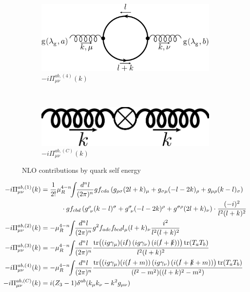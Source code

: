 \begin{figure}[ht!]
\begin{subfigure}[t]{.4\textwidth}
		\includegraphics[width=\textwidth]{pyfeyn/nlo-v-seghq}
		\caption{$-i\Pi_{\mu\nu}^{ab,(4)}(k)$}
	\end{subfigure}\\
	\begin{subfigure}[t]{.4\textwidth}
		\includegraphics[width=\textwidth]{pyfeyn/nlo-v-segc}
		\caption{$-i\Pi_{\mu\nu}^{ab,(C)}(k)$}
	\end{subfigure}
	\caption{NLO contributions by quark self energy}\label{fig:FeynNLOvseqg}
\end{figure}

\begin{align}
-i\Pi_{\mu\nu}^{ab,(1)}(k) &= \frac 1 {2!} \mu_R^{4-n}\!\!\int\!\!\frac{d^nl}{(2\pi)^n} gf_{cda}\left(g_{\rho\sigma}(2l+k)_{\mu}+g_{\sigma\mu}(-l-2k)_\rho+g_{\mu\rho}(k-l)_\sigma\right)\nonumber\\
 &\hspace{30pt}\cdot gf_{cbd}\left(g^\rho_{\ \nu}(k-l)^\sigma+g_{\ \nu}^\sigma(-l-2k)^\rho+g^{\sigma\rho}(2l+k)_\nu\right)\cdot\frac{(-i)^2}{l^2(l+k)^2}\\
-i\Pi_{\mu\nu}^{ab,(2)}(k) &= -\mu_R^{4-n}\!\!\int\!\!\frac{d^nl}{(2\pi)^n} g^2 f_{adc}f_{bcd}l_\mu(l+k)_{\nu}\frac{i^2}{l^2(l+k)^2}\\
-i\Pi_{\mu\nu}^{ab,(3)}(k) &= -\mu_R^{4-n}\!\!\int\!\!\frac{d^nl}{(2\pi)^n} \frac{\tr\!\left((ig\gamma_\mu)(i\slashed l)\left(ig\gamma_\nu\right)(i(\slashed l + \slashed k))\right)\tr(T_aT_b)}{l^2(l+k)^2}\\
-i\Pi_{\mu\nu}^{ab,(4)}(k) &= -\mu_R^{4-n}\!\!\int\!\!\frac{d^nl}{(2\pi)^n} \frac{\tr\!\left((ig\gamma_\mu)(i(\slashed l + m))\left(ig\gamma_\nu\right)(i(\slashed l + \slashed k + m))\right)\tr(T_aT_b)}{(l^2-m^2)((l+k)^2-m^2)}\\
-i\Pi_{\mu\nu}^{ab,(C)}(k) &= i(Z_3-1)\delta^{ab}(k_\mu k_\nu-k^2g_{\mu\nu})
\end{align}

